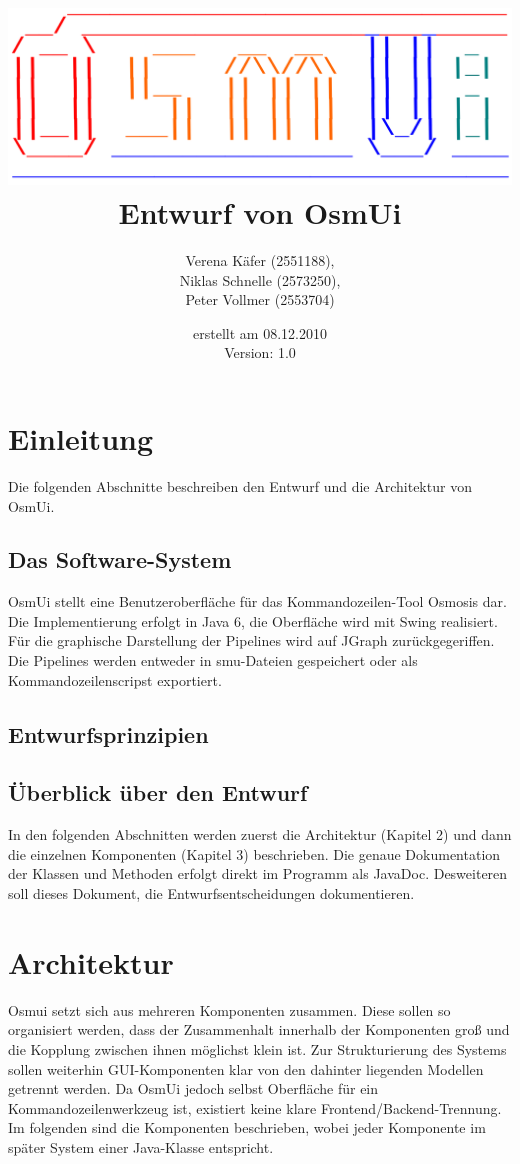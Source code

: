 \documentclass[a4paper,12pt]{scrartcl}
\author{
Verena Käfer (2551188),\\
Niklas Schnelle (2573250),\\
Peter Vollmer (2553704)}
\date{erstellt am 08.12.2010\\
Version: 1.0}
\title{\includegraphics[width=15cm]{../projektplan/Logo_Osmui.png} \\ 
Entwurf von OsmUi}
\begin{document}
\maketitle
\newpage
\tableofcontents
\newpage

\section{Einleitung}
Die folgenden Abschnitte beschreiben den Entwurf und die Architektur von OsmUi.
\subsection{Das Software-System}
OsmUi stellt eine Benutzeroberfläche für das Kommandozeilen-Tool Osmosis dar. Die Implementierung erfolgt in Java 6, die Oberfläche wird mit Swing realisiert. Für die graphische Darstellung der Pipelines wird auf JGraph zurückgegeriffen. Die Pipelines werden entweder in smu-Dateien gespeichert oder als Kommandozeilenscripst exportiert.
\subsection{Entwurfsprinzipien}

\subsection{Überblick über den Entwurf}
In den folgenden Abschnitten werden zuerst die Architektur (Kapitel 2) und dann die einzelnen Komponenten (Kapitel 3) beschrieben. Die genaue Dokumentation der Klassen und Methoden erfolgt direkt im Programm als JavaDoc. Desweiteren soll dieses Dokument, die Entwurfsentscheidungen dokumentieren.

\section{Architektur}
Osmui setzt sich aus mehreren Komponenten zusammen. Diese sollen so organisiert werden, dass der Zusammenhalt innerhalb der Komponenten groß und die Kopplung zwischen ihnen möglichst klein ist. Zur Strukturierung des Systems sollen weiterhin GUI-Komponenten klar von den dahinter liegenden Modellen getrennt werden. Da OsmUi jedoch selbst Oberfläche für ein Kommandozeilenwerkzeug ist, existiert keine klare Frontend/Backend-Trennung.\\
Im folgenden sind die Komponenten beschrieben, wobei jeder Komponente im später System einer Java-Klasse entspricht.
\end{document}
